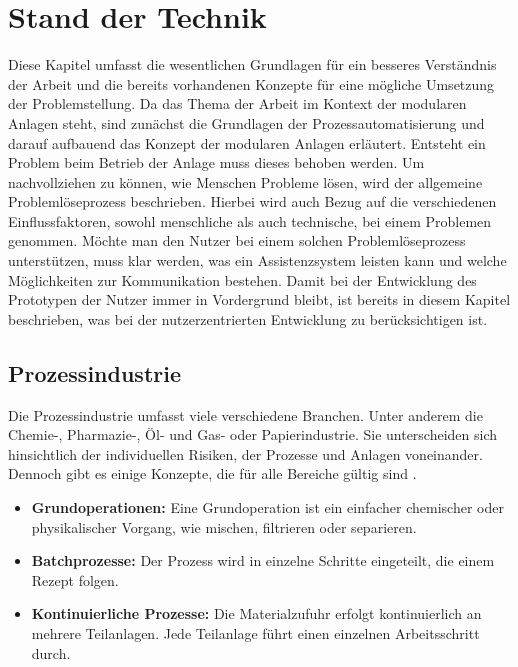 
\chapter{Stand der Technik}
\label{sec:StandDerTechnik}
Diese Kapitel umfasst die wesentlichen Grundlagen für ein besseres Verständnis der Arbeit und die bereits vorhandenen Konzepte für eine mögliche Umsetzung der Problemstellung. Da das Thema der Arbeit im Kontext der modularen Anlagen steht, sind zunächst die Grundlagen der Prozessautomatisierung und darauf aufbauend das Konzept der modularen Anlagen erläutert. Entsteht ein Problem beim Betrieb der Anlage muss dieses behoben werden. Um nachvollziehen zu können, wie Menschen Probleme lösen, wird der allgemeine Problemlöseprozess beschrieben. Hierbei wird auch Bezug auf die verschiedenen Einflussfaktoren, sowohl menschliche als auch technische, bei einem Problemen genommen. Möchte man den Nutzer bei einem solchen Problemlöseprozess unterstützen, muss klar werden, was ein Assistenzsystem leisten kann und welche Möglichkeiten zur Kommunikation bestehen. Damit bei der Entwicklung des Prototypen der Nutzer immer in Vordergrund bleibt, ist bereits  in diesem Kapitel beschrieben, was bei der nutzerzentrierten Entwicklung zu berücksichtigen ist.

\section{Prozessindustrie}
Die Prozessindustrie umfasst viele verschiedene Branchen. Unter anderem die Chemie-, Pharmazie-, Öl- und Gas- oder Papierindustrie. Sie unterscheiden sich hinsichtlich der individuellen Risiken, der Prozesse und Anlagen voneinander. Dennoch gibt es einige Konzepte, die für alle Bereiche gültig sind \cite{UrbasP2012}.
\begin{itemize}
\item \textbf{Grundoperationen:} Eine Grundoperation ist ein einfacher chemischer oder physikalischer Vorgang, wie mischen, filtrieren oder separieren.
\item \textbf{Batchprozesse:} Der Prozess wird in einzelne Schritte eingeteilt, die einem Rezept folgen.
\item \textbf{Kontinuierliche Prozesse:} Die Materialzufuhr erfolgt kontinuierlich an mehrere Teilanlagen. Jede Teilanlage führt einen einzelnen Arbeitsschritt durch.
\end{itemize}

